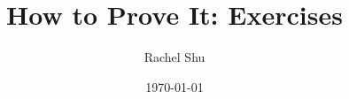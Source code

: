 \documentclass[]{report}
\title{How to Prove It: Exercises}
\author{Rachel Shu}
\date{\today}
\begin{document}
\mainfiletrue
\chapfilefalse

\maketitle

\tableofcontents
\newpage


\end{document}
